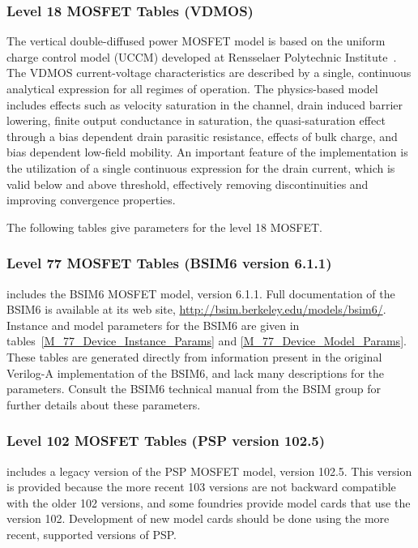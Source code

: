 \subsubsection{Level 18 MOSFET Tables (VDMOS)}
The vertical double-diffused power MOSFET model is based on the uniform charge
control model (UCCM) developed at Rensselaer Polytechnic Institute~\cite{Fjeldly:1998}.
The VDMOS current-voltage characteristics are described by a single, continuous
analytical expression for all regimes of operation.  The physics-based model
includes effects such as velocity saturation in the channel, drain induced barrier
lowering, finite output conductance in saturation, the quasi-saturation effect
through a bias dependent drain parasitic resistance, effects of bulk charge, and
bias dependent low-field mobility.  An important feature of the implementation
is the utilization of a single continuous expression for the drain current, which
is valid below and above threshold, effectively removing discontinuities and
improving convergence properties.

The following tables give parameters for the level 18 MOSFET.




\clearpage
\subsubsection{Level 77 MOSFET Tables (BSIM6 version 6.1.1)}
\Xyce{} includes the BSIM6 MOSFET model, version 6.1.1.  Full
documentation of the BSIM6 is available at its web site,
\url{http://bsim.berkeley.edu/models/bsim6/}.  Instance and model
parameters for the BSIM6 are given in
tables~\ref{M_77_Device_Instance_Params} and
\ref{M_77_Device_Model_Params}.  These tables are generated directly
from information present in the original Verilog-A implementation of
the BSIM6, and lack many descriptions for the parameters.  Consult the
BSIM6 technical manual from the BSIM group for further details about
these parameters.




\clearpage
\subsubsection{Level 102 MOSFET Tables (PSP version 102.5)}

\Xyce{} includes a legacy version of the PSP MOSFET model, version
102.5.  This version is provided because the more recent 103 versions
are not backward compatible with the older 102 versions, and some
foundries provide model cards that use the version 102.  Development
of new model cards should be done using the more recent, supported
versions of PSP.

